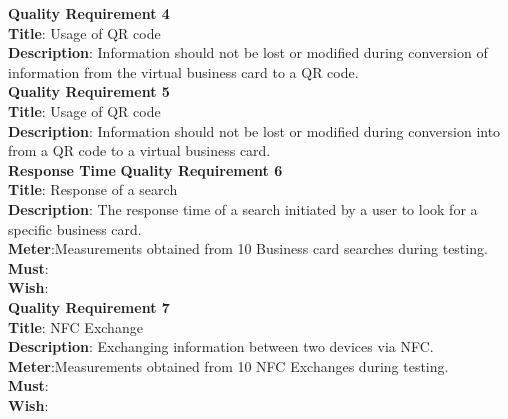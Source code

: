 \documentclass[english]{article}
\begin{document}
				\textbf{Quality Requirement 4}\\
				\textbf{Title}: Usage of QR code\\
				\textbf{Description}: Information should not be lost or modified during conversion of information from the virtual business card to a QR code.\\
				
				\textbf{Quality Requirement 5}\\
				\textbf{Title}: Usage of QR code\\
				\textbf{Description}: Information should not be lost or modified during conversion into from a QR code to a virtual business card.\\
				
				\textbf{Response Time}
				\textbf{Quality Requirement 6}\\
				\textbf{Title}: Response of a search\\
				\textbf{Description}: The response time of a search initiated by a user to look for a specific business card.\\
				\textbf{Meter}:Measurements obtained from 10 Business card searches during testing.\\
				\textbf{Must}:\\
				\textbf{Wish}:\\
				
				\textbf{Quality Requirement 7}\\
				\textbf{Title}: NFC Exchange\\
				\textbf{Description}: Exchanging information between two devices via NFC.\\
				\textbf{Meter}:Measurements obtained from 10 NFC Exchanges during testing.\\
				\textbf{Must}:\\
				\textbf{Wish}:\\
				
\end{document}

